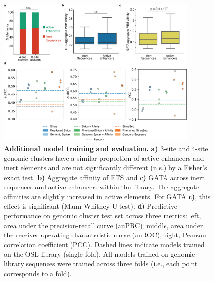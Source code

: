\begin{figure}[p]
    \centering
    \includegraphics[width=0.88\textwidth]{2_figures-and-files/SuppFig15.png}
    \caption[Additional model training and evaluation.]{\textbf{Additional model training and evaluation.} \textbf{a)} 3-site and 4-site genomic clusters have a similar proportion of active enhancers and inert elements and are not significantly different (n.s.) by a Fisher’s exact test. \textbf{b)} Aggregate affinity of ETS and \textbf{c)} GATA across inert sequences and active enhancers within the library. The aggregate affinities are slightly increased in active elements. For GATA \textbf{c)}, this effect is significant (Mann-Whitney U test). \textbf{d)} Predictive performance on genomic cluster test set across three metrics: left, area under the precision-recall curve (auPRC); middle, area under the receiver operating characteristic curve (auROC); right, Pearson correlation coefficient (PCC). Dashed lines indicate models trained on the OSL library (single fold). All models trained on genomic library sequences were trained across three folds (i.e., each point corresponds to a fold).}
    \label{fig:supplementary_15}
\end{figure}

